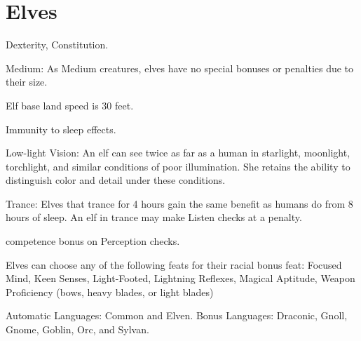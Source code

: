 \section{Elves}
\begin{itemize*}
\item {} Dexterity,  Constitution.
\item Medium: As Medium creatures, elves have no special bonuses or penalties due to their size.
\item Elf base land speed is 30 feet.
\item Immunity to sleep effects.
\item Low-light Vision: An elf can see twice as far as a human in starlight, moonlight, torchlight, and similar conditions of poor illumination. She retains the ability to distinguish color and detail under these conditions.
 \item Trance: Elves that trance for 4 hours gain the same benefit as humans do from 8 hours of sleep. An elf in trance may make Listen checks at a  penalty.
\item {} competence bonus on Perception checks.
\item Elves can choose any of the following feats for their racial bonus feat: Focused Mind, Keen Senses, Light-Footed, Lightning Reflexes, Magical Aptitude, Weapon Proficiency (bows, heavy blades, or light blades)
\item Automatic Languages: Common and Elven. Bonus Languages: Draconic, Gnoll, Gnome, Goblin, Orc, and Sylvan.
\end{itemize*}

